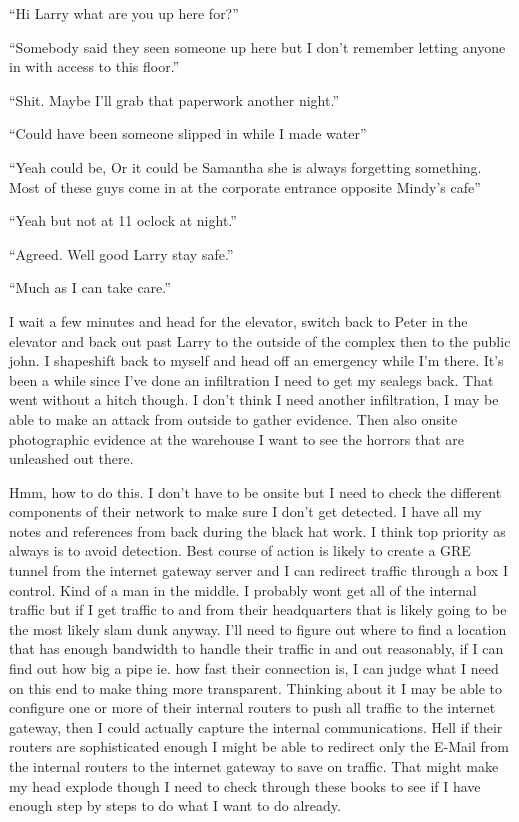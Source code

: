 ``Hi Larry what are you up here for?''

``Somebody said they seen someone up here but I don't remember letting anyone in with access to this floor.''

``Shit. Maybe I'll grab that paperwork another night.''

``Could have been someone slipped in while I made water''

``Yeah could be, Or it could be Samantha she is always forgetting something. Most of these guys come in at the corporate entrance opposite Mindy's cafe''

``Yeah but not at 11 oclock at night.''

``Agreed. Well good Larry stay safe.''

``Much as I can take care.''

I wait a few minutes and head for the elevator, switch back to Peter in the elevator and back out past Larry to the outside of the complex then to the public john. I shapeshift back to myself and head off an emergency while I'm there. It's been a while since I've done an infiltration I need to get my sealegs back. That went without a hitch though. I don't think I need another infiltration, I may be able to make an attack from outside to gather evidence. Then also onsite photographic evidence at the warehouse I want to see the horrors that are unleashed out there.

Hmm, how to do this. I don't have to be onsite but I need to check the different components of their network to make sure I don't get detected. I have all my notes and references from back during the black hat work. I think top priority as always is to avoid detection. Best course of action is likely to create a GRE tunnel from the internet gateway server and I can redirect traffic through a box I control. Kind of a man in the middle. I probably wont get all of the internal traffic but if I get traffic to and from their headquarters that is likely going to be the most likely slam dunk anyway. I'll need to figure out where to find a location that has enough bandwidth to handle their traffic in and out reasonably, if I can find out how big a pipe ie. how fast their connection is, I can judge what I need on this end to make thing more transparent. Thinking about it I may be able to configure one or more of their internal routers to push all traffic to the internet gateway, then I could actually capture the internal communications. Hell if their routers are sophisticated enough I might be able to redirect only the E-Mail from the internal routers to the internet gateway to save on traffic. That might make my head explode though I need to check through these books to see if I have enough step by steps to do what I want to do already.


